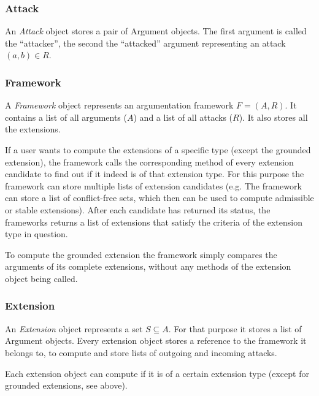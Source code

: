 \documentclass[draft,final]{vutinfth} %
\newcommand{\hl}{\par\vspace{6pt}} %
\begin{document}
\subsubsection{Attack}
An \emph{Attack} object stores a pair of Argument objects. The first argument is called the ``attacker'', the second the ``attacked'' argument representing an attack $(a,b)\in R$.\hl

\subsubsection{Framework}
A \emph{Framework} object represents an argumentation framework $F=(A,R)$. It contains a list of all arguments ($A$) and a list of all attacks ($R$). It also stores all the extensions.\hl
If a user wants to compute the extensions of a specific type (except the grounded extension), the framework calls the corresponding method of every extension candidate to find out if it indeed is of that extension type. For this purpose the framework can store multiple lists of extension candidates (e.g. The framework can store a list of conflict-free sets, which then can be used to compute admissible or stable extensions). After each candidate has returned its status, the frameworks returns a list of extensions that satisfy the criteria of the extension type in question.\hl
To compute the grounded extension the framework simply compares the arguments of its complete extensions, without any methods of the extension object being called.\hl

\subsubsection{Extension}
An \emph{Extension} object represents a set $S\subseteq A$. For that purpose it stores a list of Argument objects. Every extension object stores a reference to the framework it belongs to, to compute and store lists of outgoing and incoming attacks.\hl
Each extension object can compute if it is of a certain extension type (except for grounded extensions, see above).

\backmatter

\listoffigures

%
%
\printbibliography

\end{document}
